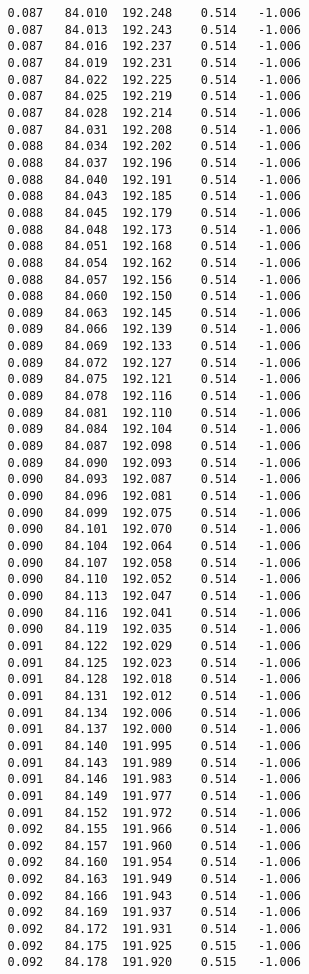 \begin{verbatim}
   0.087   84.010  192.248    0.514   -1.006
   0.087   84.013  192.243    0.514   -1.006
   0.087   84.016  192.237    0.514   -1.006
   0.087   84.019  192.231    0.514   -1.006
   0.087   84.022  192.225    0.514   -1.006
   0.087   84.025  192.219    0.514   -1.006
   0.087   84.028  192.214    0.514   -1.006
   0.087   84.031  192.208    0.514   -1.006
   0.088   84.034  192.202    0.514   -1.006
   0.088   84.037  192.196    0.514   -1.006
   0.088   84.040  192.191    0.514   -1.006
   0.088   84.043  192.185    0.514   -1.006
   0.088   84.045  192.179    0.514   -1.006
   0.088   84.048  192.173    0.514   -1.006
   0.088   84.051  192.168    0.514   -1.006
   0.088   84.054  192.162    0.514   -1.006
   0.088   84.057  192.156    0.514   -1.006
   0.088   84.060  192.150    0.514   -1.006
   0.089   84.063  192.145    0.514   -1.006
   0.089   84.066  192.139    0.514   -1.006
   0.089   84.069  192.133    0.514   -1.006
   0.089   84.072  192.127    0.514   -1.006
   0.089   84.075  192.121    0.514   -1.006
   0.089   84.078  192.116    0.514   -1.006
   0.089   84.081  192.110    0.514   -1.006
   0.089   84.084  192.104    0.514   -1.006
   0.089   84.087  192.098    0.514   -1.006
   0.089   84.090  192.093    0.514   -1.006
   0.090   84.093  192.087    0.514   -1.006
   0.090   84.096  192.081    0.514   -1.006
   0.090   84.099  192.075    0.514   -1.006
   0.090   84.101  192.070    0.514   -1.006
   0.090   84.104  192.064    0.514   -1.006
   0.090   84.107  192.058    0.514   -1.006
   0.090   84.110  192.052    0.514   -1.006
   0.090   84.113  192.047    0.514   -1.006
   0.090   84.116  192.041    0.514   -1.006
   0.090   84.119  192.035    0.514   -1.006
   0.091   84.122  192.029    0.514   -1.006
   0.091   84.125  192.023    0.514   -1.006
   0.091   84.128  192.018    0.514   -1.006
   0.091   84.131  192.012    0.514   -1.006
   0.091   84.134  192.006    0.514   -1.006
   0.091   84.137  192.000    0.514   -1.006
   0.091   84.140  191.995    0.514   -1.006
   0.091   84.143  191.989    0.514   -1.006
   0.091   84.146  191.983    0.514   -1.006
   0.091   84.149  191.977    0.514   -1.006
   0.091   84.152  191.972    0.514   -1.006
   0.092   84.155  191.966    0.514   -1.006
   0.092   84.157  191.960    0.514   -1.006
   0.092   84.160  191.954    0.514   -1.006
   0.092   84.163  191.949    0.514   -1.006
   0.092   84.166  191.943    0.514   -1.006
   0.092   84.169  191.937    0.514   -1.006
   0.092   84.172  191.931    0.514   -1.006
   0.092   84.175  191.925    0.515   -1.006
   0.092   84.178  191.920    0.515   -1.006

\end{verbatim}
